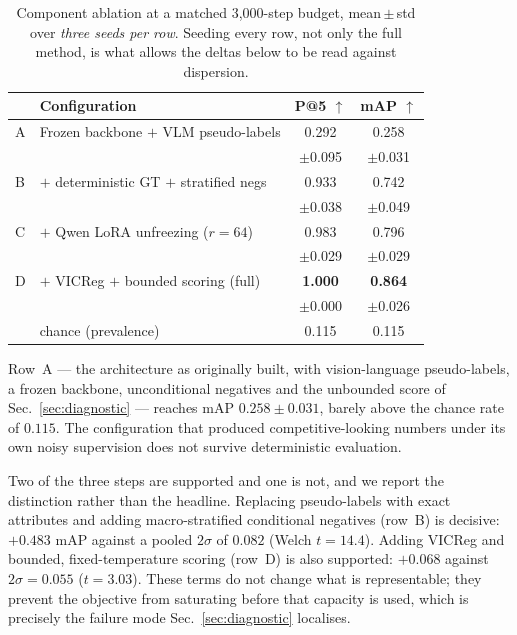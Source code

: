 \documentclass[10pt,twocolumn,letterpaper]{article}
\begin{document}
\begin{table}[t]\centering\footnotesize
\setlength{\tabcolsep}{3pt}
\begin{tabular}{llcc}
\toprule
& Configuration & P@5 $\uparrow$ & mAP $\uparrow$ \\
\midrule
A & Frozen backbone $+$ VLM pseudo-labels & 0.292 & 0.258 \\
  &  & {\scriptsize$\pm$0.095} & {\scriptsize$\pm$0.031} \\
B & $+$ deterministic GT $+$ stratified negs & 0.933 & 0.742 \\
  &  & {\scriptsize$\pm$0.038} & {\scriptsize$\pm$0.049} \\
C & $+$ Qwen LoRA unfreezing ($r{=}64$) & 0.983 & 0.796 \\
  &  & {\scriptsize$\pm$0.029} & {\scriptsize$\pm$0.029} \\
D & $+$ VICReg $+$ bounded scoring (full) & \textbf{1.000} & \textbf{0.864} \\
  &  & {\scriptsize$\pm$0.000} & {\scriptsize$\pm$0.026} \\
\midrule
  & chance (prevalence) & 0.115 & 0.115 \\
\bottomrule
\end{tabular}
\caption{Component ablation at a matched 3{,}000-step budget,
mean\,$\pm$\,std over \emph{three seeds per row}. Seeding every row, not only
the full method, is what allows the deltas below to be read against
dispersion.}
\label{tab:ablation}
\end{table}

Row~A --- the architecture as originally built, with vision-language
pseudo-labels, a frozen backbone, unconditional negatives and the unbounded
score of Sec.~\ref{sec:diagnostic} --- reaches mAP $0.258\!\pm\!0.031$,
barely above the chance rate of $0.115$. The configuration that produced
competitive-looking numbers under its own noisy supervision does not survive
deterministic evaluation.

Two of the three steps are supported and one is not, and we report the
distinction rather than the headline. Replacing pseudo-labels with exact
attributes and adding macro-stratified conditional negatives (row~B) is
decisive: $+0.483$ mAP against a pooled $2\sigma$ of $0.082$ (Welch
$t=14.4$). Adding VICReg and bounded, fixed-temperature scoring (row~D) is
also supported: $+0.068$ against $2\sigma=0.055$ ($t=3.03$). These terms do
not change what is representable; they prevent the objective from saturating
before that capacity is used, which is precisely the failure mode
Sec.~\ref{sec:diagnostic} localises.
\end{document}
